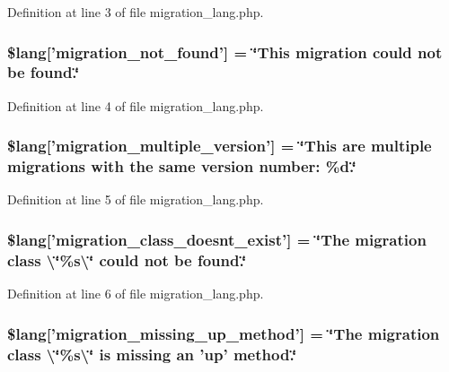 Definition at line 3 of file migration\-\_\-lang.\-php.

\subsubsection[{\$lang}]{\setlength{\rightskip}{0pt plus 5cm}\$lang['migration\-\_\-not\-\_\-found'] = \char`\"{}This migration could {\bf not} be found.\char`\"{}}\label{migration__lang_8php_a92dd777422d70950993d43f4d0c31b1b}


Definition at line 4 of file migration\-\_\-lang.\-php.

\subsubsection[{\$lang}]{\setlength{\rightskip}{0pt plus 5cm}\$lang['migration\-\_\-multiple\-\_\-version'] = \char`\"{}This are multiple migrations with the same version number\-: \%d.\char`\"{}}\label{migration__lang_8php_a1a98130d04f280e6a5f6f509179f9e01}


Definition at line 5 of file migration\-\_\-lang.\-php.

\subsubsection[{\$lang}]{\setlength{\rightskip}{0pt plus 5cm}\$lang['migration\-\_\-class\-\_\-doesnt\-\_\-exist'] = \char`\"{}The migration class \textbackslash{}\char`\"{}\%s\textbackslash{}\char`\"{} could {\bf not} be found.\char`\"{}}\label{migration__lang_8php_a141dceda5b8294f6e4ddf7e5da6fe71d}


Definition at line 6 of file migration\-\_\-lang.\-php.

\subsubsection[{\$lang}]{\setlength{\rightskip}{0pt plus 5cm}\$lang['migration\-\_\-missing\-\_\-up\-\_\-method'] = \char`\"{}The migration class \textbackslash{}\char`\"{}\%s\textbackslash{}\char`\"{} is missing an 'up' method.\char`\"{}}\label{migration__lang_8php_a4bc9c60a4f078d1845d1d72370c363e8}


